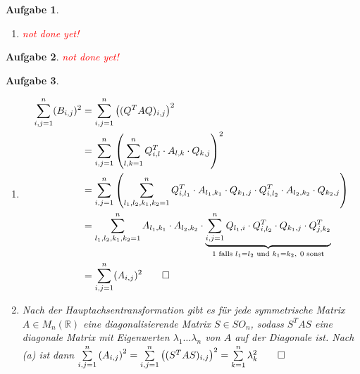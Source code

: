 \documentclass[11pt]{article}
\theoremstyle{break}
\newtheorem{task}{Aufgabe}
\def\R{\ensuremath{\mathbb{R}}}
\def\ndy{
    \textcolor{red} {\hfill not done yet!}
    \reversemarginpar
    \marginpar{\raggedleft\textcolor{red}{\rule{2mm}{2mm}}}
}
\begin{document}
\begin{task}
\begin{enumerate}[label={(\alph*)}]
\begin{align*}
\begin{pmatrix}
                -0.577 & 0.243 & -0.797\\
                -0.577 & -0.797 & 0.243
            \end{pmatrix}\\
            &&R&\approx \begin{pmatrix}
                1.85 & -1.94\\
                0 & 0.0383\\
                0 & 0
            \end{pmatrix}\\
        \end{align*}
        Anmerkung: Ich habe vergessen, bei den Normen / der Berechnung von $\alpha$ zu runden. Das habe ich allerdings zu spät bermerkt und jetzt will ich nicht alles nochmal umschreiben.
        \item \ndy
    \end{enumerate}
\end{task}
\begin{task}
    \ndy
\end{task}
\begin{task}
    \hfill\vspace{-5mm}
    \begin{enumerate}[label={(\alph*)}]
        \item \begin{align*}
            \sum\limits_{i,j=1}^{n} (B_{i,j})^2 &=\sum\limits_{i,j=1}^{n} \left((Q^T A Q)_{i,j}\right)^2\\
            &=\sum\limits_{i,j=1}^{n} \left(\sum\limits_{l,k=1}^{n} Q^T_{i,l}\cdot A_{l,k}\cdot Q_{k,j}\right)^2\\
            &=\sum\limits_{i,j=1}^{n}\left(\sum\limits_{l_1,l_2,k_1,k_2=1}^{n} Q^T_{i,l_1}\cdot A_{l_1,k_1}\cdot Q_{k_1,j}\cdot Q^T_{i,l_2}\cdot A_{l_2,k_2}\cdot Q_{k_2,j}\right)\\
            &=\sum\limits_{l_1,l_2,k_1,k_2=1}^{n} A_{l_1,k_1}\cdot A_{l_2,k_2}\cdot \underbrace{\sum\limits_{i,j=1}^{n} Q_{l_1,i}\cdot Q^T_{i,l_2}\cdot Q_{k_1,j}\cdot Q^T_{j,k_2}}_{1\text{ falls } l_1=l_2\text{ und } k_1=k_2,\ 0\text{ sonst}}\\
            &=\sum\limits_{i,j=1}^{n} (A_{i,j})^2\qed
        \end{align*}
        \item Nach der Hauptachsentransformation gibt es für jede symmetrische Matrix $A\in M_n(\R)$ eine diagonalisierende Matrix $S\in SO_n$, sodass $S^T A S$ eine diagonale Matrix mit Eigenwerten $\lambda_1\ldots\lambda_n$ von $A$ auf der Diagonale ist. Nach (a) ist dann $\sum\limits_{i,j=1}^n \left(A_{i,j}\right)^2 = \sum\limits_{i,j=1}^n \left((S^T A S)_{i,j}\right)^2 = \sum\limits_{k=1}^n \lambda_{k}^2\qed$
    \end{enumerate}
\end{task}
\end{document}
